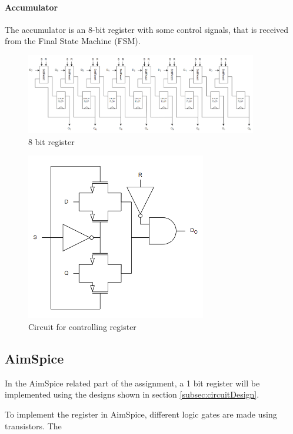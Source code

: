 \paragraph{Accumulator}
The accumulator is an 8-bit register with some control signals, that is received from the Final State Machine (FSM). 

\begin{figure}[H]
    \centering
    \includegraphics[width=0.9\textwidth]{Figures/8bitRegister.png}
    \caption{8 bit register}
    \label{fig:8bitregister}
\end{figure}
\begin{figure}[H]
    \centering
    \includegraphics[width=0.7\textwidth]{Figures/setReset.png}
    \caption{Circuit for controlling register}
    \label{fig:setreset}
\end{figure}

\subsection{AimSpice}
In the AimSpice related part of the assignment, a 1 bit register will be implemented using the designs shown in section \ref{subsec:circuitDesign}. 

To implement the register in AimSpice, different logic gates are made using transistors. The 


